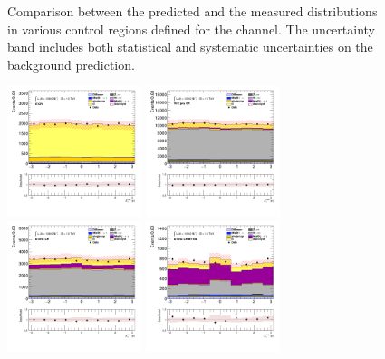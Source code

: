\begin{figure}[!htp]
\begin{center}
			\end{center}
			\caption{
			Comparison between the predicted and the measured \Etm distributions in various control regions defined for the \taujets channel. The uncertainty band includes both statistical and systematic uncertainties on the background prediction. 
			}
			\label{fig:bkg-met-taujets}
		\end{figure}

		\begin{figure}[!htp]
			\begin{center}    
			\includegraphics[width=0.35\textwidth]{chapters/chapter6_HPlus/images/taujets/met_phi_TTBAR.png}
			\includegraphics[width=0.35\textwidth]{chapters/chapter6_HPlus/images/taujets/met_phi_WJETS.png} \\
			\includegraphics[width=0.35\textwidth]{chapters/chapter6_HPlus/images/taujets/met_phi_BVETO.png}
			\includegraphics[width=0.35\textwidth]{chapters/chapter6_HPlus/images/taujets/met_phi_BVETO_MT100.png} \\

\end{center}
\end{figure}
